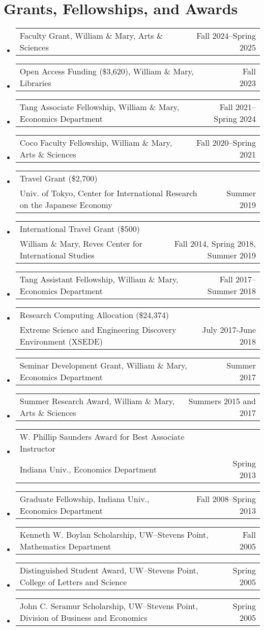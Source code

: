 \documentclass[10pt,letterpaper,en-US]{article}
\makeatletter
\newcommand{\itemrow}[2]
{\begin{tabular*}{\linewidth}{l@{\extracolsep{\fill}}r}
	#1 & #2 \\
\end{tabular*}}
\makeatother
\begin{document}
\section*{Grants, Fellowships, and Awards}
\begin{itemize}
\item \itemrow{Faculty Grant, William \& Mary, Arts \& Sciences}{Fall 2024--Spring 2025}
\item \itemrow{Open Access Funding (\$3,620), William \& Mary, Libraries}{Fall 2023}
\item \itemrow{Tang Associate Fellowship, William \& Mary, Economics Department}{Fall 2021--Spring 2024}
\item \itemrow{Coco Faculty Fellowship, William \& Mary, Arts \& Sciences}{Fall 2020--Spring 2021}
\item \itemrow{Travel Grant (\$2,700) \\ Univ. of Tokyo, Center for International Research on the Japanese Economy}{Summer 2019}
\item \itemrow{International Travel Grant (\$500) \\ William \& Mary, Reves Center for International Studies}{Fall 2014, Spring 2018, Summer 2019}
\item \itemrow{Tang Assistant Fellowship, William \& Mary, Economics Department}{Fall 2017--Summer 2018}
\item \itemrow{Research Computing Allocation (\$24,374)\\
Extreme Science and Engineering Discovery Environment (XSEDE)}{July 2017-June 2018}
\item \itemrow{Seminar Development Grant, William \& Mary, Economics Department}{Summer 2017}
\item \itemrow{Summer Research Award, William \& Mary, Arts \& Sciences}{Summers 2015 and 2017}
\item \itemrow{W. Phillip Saunders Award for Best Associate Instructor \\
Indiana Univ., Economics Department}{Spring 2013}
\item \itemrow{Graduate Fellowship, Indiana Univ., Economics Department}{Fall 2008--Spring 2013}
\item \itemrow{Kenneth W. Boylan Scholarship, UW--Stevens Point, Mathematics Department}{Fall 2005}
\item \itemrow{Distinguished Student Award, UW--Stevens Point, College of Letters and Science}{Spring 2005}
\item \itemrow{John C. Seramur Scholarship, UW--Stevens Point, Division of Business and Economics}{Spring 2005}
\end{itemize}
\end{document}
